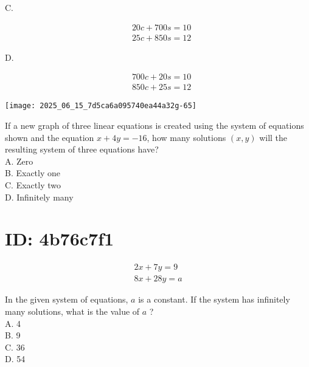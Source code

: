 C.

$$
\begin{aligned}
& 20 c+700 s=10 \\
& 25 c+850 s=12
\end{aligned}
$$

D.

$$
\begin{aligned}
& 700 c+20 s=10 \\
& 850 c+25 s=12
\end{aligned}
$$

\begin{center}
\texttt{[image: 2025\_06\_15\_7d5ca6a095740ea44a32g-65]}
\end{center}

If a new graph of three linear equations is created using the system of equations shown and the equation $x+4 y=-16$, how many solutions $(x, y)$ will the resulting system of three equations have?\\
A. Zero\\
B. Exactly one\\
C. Exactly two\\
D. Infinitely many

\section*{ID: 4b76c7f1}
$$
\begin{array}{r}
2 x+7 y=9 \\
8 x+28 y=a
\end{array}
$$

In the given system of equations, $a$ is a constant. If the system has infinitely many solutions, what is the value of $a$ ?\\
A. 4\\
B. 9\\
C. 36\\
D. 54


